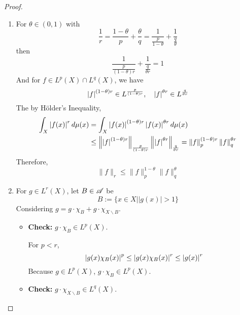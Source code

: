\begin{proof}
	\begin{enumerate}[label=(\arabic{*})]
		\item For $\theta \in (0,1)$ with
		\begin{equation*}
			\frac{1}{r} = \frac{1 - \theta}{p} + \frac{\theta}{q} = \frac{1}{\frac{p}{1-\theta}} + \frac{1}{\frac{q}{\theta}}
		\end{equation*}
		then
		\begin{equation*}
			\frac{1}{\frac{p}{(1-\theta) r}}+\frac{1}{\frac{q}{\theta r}}=1
		\end{equation*}
		And for $f \in L^p(X) \cap L^q(X)$, we have
		\begin{equation*}
			\left\lvert f\right\lvert^{(1-\theta) r} \in L^{\frac{p}{(1-\theta) r}},\quad \left\lvert f\right\lvert^{\theta r} \in L^{\frac{q}{\theta r}}
		\end{equation*}
		The by H\"older's Inequality,
		\begin{equation*}
			\begin{aligned}
				\int_X \left\lvert f(x)\right\lvert^rd\mu(x) &= \int_X \left\lvert f(x)\right\lvert^{(1-\theta)r}\left\lvert f(x)\right\lvert^{\theta r}d\mu(x) \\
				&\leq \left\lVert\left\lvert f\right\lvert^{(1-\theta)r}\right\lVert_{\frac{p}{(1-\theta)r}}\left\lVert\left\lvert f\right\lvert^{\theta r}\right\lVert_{\frac{q}{\theta r}} = \left\lVert{f}\right\lVert^{(1-\theta)r}_{p}\left\lVert{f}\right\lVert^{\theta r}_{q}
			\end{aligned}
		\end{equation*}
		Therefore,
		\begin{equation*}
			\|f\|_{r} \leq\|f\|_{p}^{1-\theta}\|f\|_{q}^\theta
		\end{equation*}

		\item For $g \in L^r(X)$, let $B \in \mathscr{A}$ be
		\begin{equation*}
			B:=\{x \in X| | g(x) \mid>1\}
		\end{equation*}
		Considering $g = g \cdot \chi_B + g \cdot \chi_{X\backslash B}$.
		\begin{itemize}
			\item \textbf{Check:} $g \cdot \chi_B \in L^p(X)$.

			\noindent For $p < r$,
			\begin{equation}
				\left\lvert g(x)\chi_B(x)\right\lvert^p \leq \left\lvert g(x)\chi_B(x)\right\lvert^r \leq \left\lvert g(x)\right\lvert^r
			\end{equation}
			Because $g \in L^p(X)$, $g \cdot \chi_B \in L^p(X)$.

			\item \textbf{Check:} $g \cdot \chi_{X\backslash B} \in L^q(X)$.


\end{itemize}
\end{enumerate}
\end{proof}
